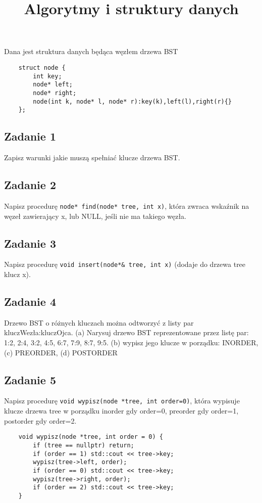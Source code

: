 \documentclass{article}
\begin{document}
\title{Algorytmy i struktury danych}
\author{}
\date{}
\maketitle

Dana jest struktura danych będąca węzłem drzewa BST
\begin{lstlisting}
    struct node {
        int key;
        node* left;
        node* right;
        node(int k, node* l, node* r):key(k),left(l),right(r){}
    };
\end{lstlisting}

\subsection*{Zadanie 1}
Zapisz warunki jakie muszą spełniać klucze drzewa BST.

\subsection*{Zadanie 2}
Napisz procedurę \verb|node* find(node* tree, int x)|, która zwraca wskaźnik na węzeł
zawierający x, lub NULL, jeśli nie ma takiego węzła.

\subsection*{Zadanie 3}
Napisz procedurę \verb|void insert(node*& tree, int x)| (dodaje do drzewa tree klucz x).

\subsection*{Zadanie 4}
Drzewo BST o różnych kluczach można odtworzyć z listy par kluczWezła:kluczOjca. (a) Narysuj
drzewo BST reprezentowane przez listę par: 1:2, 2:4, 3:2, 4:5, 6:7, 7:9, 8:7, 9:5.
(b) wypisz jego klucze w porządku: INORDER, (c) PREORDER, (d) POSTORDER

\subsection*{Zadanie 5}
Napisz procedurę \verb|void wypisz(node *tree, int order=0)|, która wypisuje klucze drzewa tree
w porządku inorder gdy order=0, preorder gdy order=1, postorder gdy order=2.
\begin{lstlisting}
    void wypisz(node *tree, int order = 0) {
        if (tree == nullptr) return;
        if (order == 1) std::cout << tree->key;
        wypisz(tree->left, order);
        if (order == 0) std::cout << tree->key;
        wypisz(tree->right, order);
        if (order == 2) std::cout << tree->key;
    }
\end{lstlisting}
\end{document}
